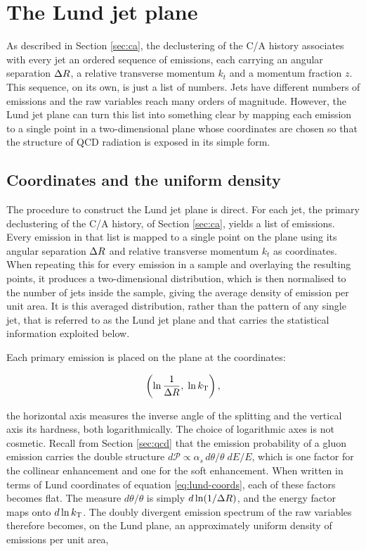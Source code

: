 \section{The Lund jet plane}
\label{sec:lund}

As described in Section \ref{sec:ca}, the declustering of the C/A history associates
with every jet an ordered sequence of emissions, each carrying an
angular separation $\Delta R$, a relative transverse momentum $k_t$ and a momentum 
fraction $z$. This sequence, on its own, is just a list of numbers. Jets
have different numbers of emissions and the raw variables reach many orders of magnitude.
However, the Lund jet plane \cite{Dreyer:2018nbf} can turn this list into something
clear by mapping each emission to a single point in a two-dimensional 
plane whose coordinates are chosen so that the structure of QCD radiation is exposed 
in its simple form.

\subsection{Coordinates and the uniform density}
\label{sec:lund-uniform}

The procedure to construct the Lund jet plane is direct. For each jet, the primary
declustering of the C/A history, of Section \ref{sec:ca}, yields a list of emissions.
Every emission in that list is mapped to a single point on the plane using its 
angular separation $\Delta R$ and relative transverse momentum $k_t$ as coordinates.
When repeating this for every emission in a sample and overlaying the resulting points,
it produces a two-dimensional distribution, which is then normalised to the number of jets inside
the sample, giving the average density of emission per unit area. It is this averaged distribution,
rather than the pattern of any single jet, that is referred to as the Lund jet plane
and that carries the statistical information exploited below. 

Each primary emission is placed on the plane at the coordinates:

\begin{equation}
  \left( \ln\frac{1}{\Delta R},\; \ln k_{\mathrm{T}} \right),
  \label{eq:lund-coords}
\end{equation}

the horizontal axis measures the inverse angle of the splitting and the vertical
axis its hardness, both logarithmically. The choice of logarithmic axes is
not cosmetic. Recall from Section \ref{sec:qcd} that the emission probability
of a gluon emission carries the double structure $d\mathcal{P} \propto \alpha_s\, d\theta/\theta \; dE/E$,
which is one factor for the collinear enhancement and one for the soft enhancement.
When written in terms of Lund coordinates of equation \eqref{eq:lund-coords}, each
of these factors becomes flat. The measure $d\theta/\theta$ is simply $d\ln(1/\Delta R)$, and the energy factor
maps onto $d\ln k_{\mathrm{T}}$. The doubly divergent emission spectrum of the raw variables
therefore becomes, on the Lund plane, an approximately uniform density of
emissions per unit area,

